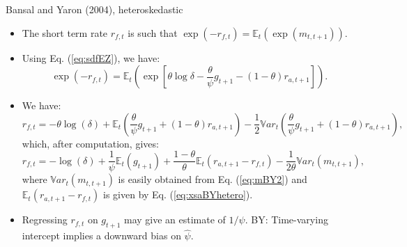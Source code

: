 \begin{frame}{Bansal and Yaron (2004), heteroskedastic}\label{slide:rfBY}
\begin{footnotesize}
\begin{itemize}
	\item The short term rate $r_{f,t}$ is such that $\exp(-r_{f,t})=\mathbb{E}_t(\exp(m_{t,t+1}))$.
	\item Using Eq. (\ref{eq:sdfEZ}), we have:
	$$
	\exp(-r_{f,t})=\mathbb{E}_t\left(\exp\left[\theta \log \delta - \frac{\theta}{\psi} g_{t+1} - (1-\theta) r_{a,t+1}\right]\right).
	$$
	\item We have:
	\begin{equation}
	r_{f,t} = - \theta \log (\delta) + \mathbb{E}_t\left(\frac{\theta}{\psi} g_{t+1}+ (1-\theta)r_{a,t+1} \right) - \frac{1}{2}\mathbb{V}ar_t\left(\frac{\theta}{\psi} g_{t+1} + (1-\theta) r_{a,t+1}\right),
	\end{equation}
	which, after computation, gives:
	\begin{equation}\label{eq:rfBY}
	r_{f,t} = - \log (\delta) + \frac{1}{\psi}\mathbb{E}_t(g_{t+1})+ \frac{1-\theta}{\theta} \mathbb{E}_t(r_{a,t+1}-r_{f,t}) - \frac{1}{2\theta}\mathbb{V}ar_t\left(m_{t,t+1}\right),
	\end{equation}
	 where $\mathbb{V}ar_t\left(m_{t,t+1}\right)$ is easily obtained from Eq. (\ref{eq:mBY2}) and $\mathbb{E}_t(r_{a,t+1}-r_{f,t})$ is given by Eq. (\ref{eq:xsaBYhetero}). \hyperlink{slide:rfBYappendix}{} 
	 \item Regressing $r_{f,t}$ on $g_{t+1}$ may give an estimate of $1/\psi$. BY: Time-varying intercept implies a downward bias on $\hat\psi$.
\end{itemize}
\end{footnotesize}
\end{frame}

